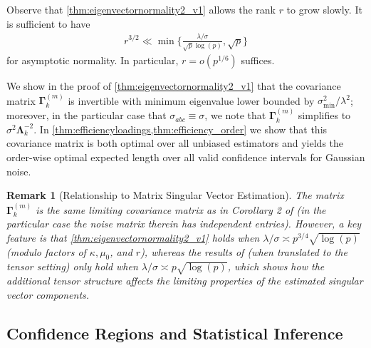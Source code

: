 \documentclass[10pt]{article}
\newcommand{\0}{{\mathbf{0}}}
\newcommand{\1}{{\mathbf{1}}}
\renewcommand{\citet}{\cite}
\newtheorem{remark}{Remark}
\begin{document}
 
 
 
  Observe that \cref{thm:eigenvectornormality2_v1} allows the rank $r$ to grow slowly.  It is sufficient to have
 \begin{align*}
     r^{3/2} \ll \min\bigg\{ \frac{\lambda/\sigma}{\sqrt{p} \log(p)}, \sqrt{p}\bigg\}
 \end{align*}
  for asymptotic normality. In particular,  $r = o(p^{1/6})$ suffices.  
  
  We show in the proof of \cref{thm:eigenvectornormality2_v1} that the covariance matrix $\mathbf{\Gamma}^{(m)}_k$ is invertible with minimum eigenvalue lower bounded by $\sigma_{\min}^2/\lambda^2$; moreover, in the particular case that $\sigma_{abc} \equiv \sigma$, we note that $\mathbf{\Gamma}^{(m)}_k$ simplifies to $\sigma^2 \mathbf{\Lambda}_k^{-2}$. In \cref{thm:efficiencyloadings,thm:efficiency_order} we show that this covariance matrix is both optimal over all unbiased estimators and yields the order-wise optimal expected length over all valid confidence intervals for Gaussian noise.
  
   \begin{remark}[Relationship to Matrix Singular Vector Estimation]
   The  matrix $\mathbf{\Gamma}^{(m)}_k$ is the same limiting covariance matrix as in Corollary 2 of \citet{agterberg_entrywise_2022} (in the particular case the noise matrix therein has independent entries).  However, a key feature is that \cref{thm:eigenvectornormality2_v1} holds when $\lambda/\sigma \asymp p^{3/4} \sqrt{\log(p)}$  (modulo factors of $\kappa, \mu_0$, and $r$), whereas the results of \citet{agterberg_entrywise_2022} (when translated to the tensor setting) only hold when $\lambda/\sigma \asymp p \sqrt{\log(p)}$, which shows how the additional tensor structure affects the limiting properties of the estimated singular vector components. 
  \end{remark}
  
 
  
 
 
  \subsection{Confidence Regions and Statistical Inference}
  \label{sec:loadingsinference}
  
\end{document}
